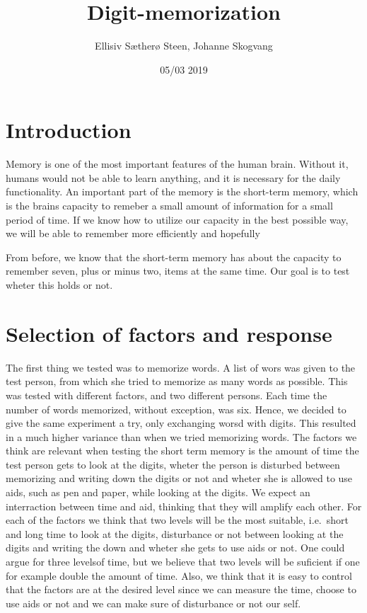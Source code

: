 \documentclass[]{article}
\title{Digit-memorization}
\author{Ellisiv Sætherø Steen, Johanne Skogvang}
\date{05/03 2019}
\begin{document}
\maketitle

\section{Introduction}\label{introduction}

Memory is one of the most important features of the human brain. Without
it, humans would not be able to learn anything, and it is necessary for
the daily functionality. An important part of the memory is the
short-term memory, which is the brains capacity to remeber a small
amount of information for a small period of time. If we know how to
utilize our capacity in the best possible way, we will be able to
remember more efficiently and hopefully

From before, we know that the short-term memory has about the capacity
to remember seven, plus or minus two, items at the same time. Our goal
is to test wheter this holds or not.

\section{Selection of factors and
response}\label{selection-of-factors-and-response}

The first thing we tested was to memorize words. A list of wors was
given to the test person, from which she tried to memorize as many words
as possible. This was tested with different factors, and two different
persons. Each time the number of words memorized, without exception, was
six. Hence, we decided to give the same experiment a try, only
exchanging worsd with digits. This resulted in a much higher variance
than when we tried memorizing words. The factors we think are relevant
when testing the short term memory is the amount of time the test person
gets to look at the digits, wheter the person is disturbed between
memorizing and writing down the digits or not and wheter she is allowed
to use aids, such as pen and paper, while looking at the digits. We
expect an interraction between time and aid, thinking that they will
amplify each other. For each of the factors we think that two levels
will be the most suitable, i.e.~short and long time to look at the
digits, disturbance or not between looking at the digits and writing the
down and wheter she gets to use aids or not. One could argue for three
levelsof time, but we believe that two levels will be suficient if one
for example double the amount of time. Also, we think that it is easy to
control that the factors are at the desired level since we can measure
the time, choose to use aids or not and we can make sure of disturbance
or not our self.
\end{document}

